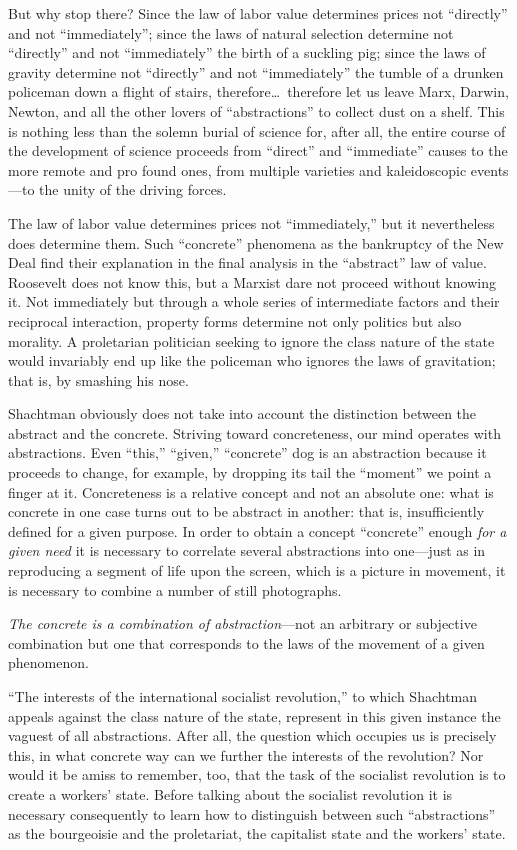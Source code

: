 But why stop there? Since the law of labor value determines prices not “directly” and not “immediately”; since the laws of natural selection determine not “directly” and not “immediately” the birth of a suckling pig; since the laws of gravity determine not “directly” and not “immediately” the tumble of a drunken policeman down a flight of stairs, therefore\dots\ therefore let us leave Marx, Darwin, Newton, and all the other lovers of “abstractions” to collect dust on a shelf. This is nothing less than the solemn burial of science for, after all, the entire course of the development of science proceeds from “direct” and “immediate” causes to the more remote and pro found ones, from multiple varieties and kaleidoscopic events---to the unity of the driving forces.

The law of labor value determines prices not “immediately,” but it nevertheless does determine them. Such “concrete” phenomena as the bankruptcy of the New Deal find their explanation in the final analysis in the “abstract” law of value. Roosevelt does not know this, but a Marxist dare not proceed without knowing it. Not immediately but through a whole series of intermediate factors and their reciprocal interaction, property forms determine not only politics but also morality. A proletarian politician seeking to ignore the class nature of the state would invariably end up like the policeman who ignores the laws of gravitation; that is, by smashing his nose.

Shachtman obviously does not take into account the distinction between the abstract and the concrete. Striving toward concreteness, our mind operates with abstractions. Even “this,” “given,” “concrete” dog is an abstraction because it proceeds to change, for example, by dropping its tail the “moment” we point a finger at it. Concreteness is a relative concept and not an absolute one: what is concrete in one case turns out to be abstract in another: that is, insufficiently defined for a given purpose. In order to obtain a concept “concrete” enough \emph{for a given need} it is necessary to correlate several abstractions into one---just as in reproducing a segment of life upon the screen, which is a picture in movement, it is necessary to combine a number of still photographs.

\emph{The concrete is a combination of abstraction}---not an arbitrary or subjective combination but one that corresponds to the laws of the movement of a given phenomenon.

“The interests of the international socialist revolution,” to which Shachtman appeals against the class nature of the state, represent in this given instance the vaguest of all abstractions. After all, the question which occupies us is precisely this, in what concrete way can we further the interests of the revolution? Nor would it be amiss to remember, too, that the task of the socialist revolution is to create a workers’ state. Before talking about the socialist revolution it is necessary consequently to learn how to distinguish between such “abstractions” as the bourgeoisie and the proletariat, the capitalist state and the workers’ state.

